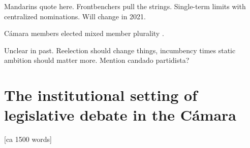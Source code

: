 \documentclass[letter,12pt]{article}
\begin{document}



Mandarins quote here. Frontbenchers pull the strings. Single-term limits with centralized nominations. Will change in 2021. 


Cámara members elected mixed member plurality \citep{weldonMixedMemberSys2001}.


Unclear in past. Reelection should change things, incumbency times static ambition should matter more. Mention candado partidista? 

\section{The institutional setting of legislative debate in the Cámara} [ca 1500 words]

\end{document}
